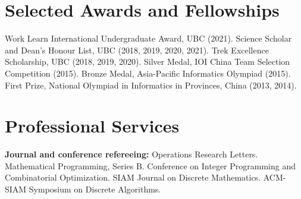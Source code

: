 \documentclass[letterpaper,11pt]{article}
\makeatletter
\newcommand{\awardSubItem}[2]{
  \item
    \begin{tabular*}{0.97\textwidth}{l@{\extracolsep{\fill}}r}
      \textbf{\small #1} & \textit{\small #2} \\
    \end{tabular*}\vspace{-8pt}
}
\newcommand{\resumeSubHeadingListStart}{\begin{itemize}[leftmargin=*]}
\newcommand{\resumeSubHeadingListEnd}{\end{itemize}}
\makeatother
\begin{document}
\section{Selected Awards and Fellowships}
Work Learn International Undergraduate Award, UBC (2021). Science Scholar and Dean's Honour List, UBC (2018, 2019, 2020, 2021). Trek Excellence Scholarship, UBC (2018, 2019, 2020). Silver Medal, IOI China Team Selection Competition (2015). Bronze Medal, Asia-Pacific Informatics Olympiad (2015). First Prize, National Olympiad in Informatics in Provinces, China (2013, 2014).

\section{Professional Services}
{\bf Journal and conference refereeing:} Operations Research Letters. Mathematical Programming, Series B. Conference on Integer Programming and Combinatorial Optimization. SIAM Journal on Discrete Mathematics. ACM-SIAM Symposium on Discrete Algorithms.

\end{document}
